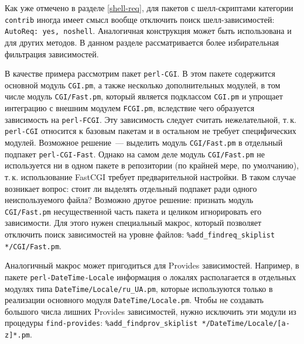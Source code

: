 \documentclass[russian,a4paper,12pt,titlepage]{article}
\begin{document}
Как уже отмечено в разделе \ref{shell-req}, для пакетов с шелл-скриптами категории \verb|contrib|
иногда имеет смысл вообще отключить поиск шелл-зависимостей: \texttt{AutoReq: yes, noshell}.  Аналогичная
конструкция может быть использована и для других методов.  В данном разделе рассматривается более избирательная
фильтрация зависимостей.

В качестве примера рассмотрим пакет \verb|perl-CGI|.  В этом пакете содержится основной модуль \verb|CGI.pm|,
а также несколько дополнительных модулей, в том числе модуль \verb|CGI/Fast.pm|, который является подклассом \verb|CGI.pm|
и упрощает интеграцию с внешним модулем \verb|FCGI.pm|, вследствие чего образуется зависимость на \verb|perl-FCGI|.
Эту зависимость следует считать нежелательной, т.\,к. \verb|perl-CGI| относится к базовым пакетам и в остальном не требует
специфических модулей.  Возможное решение~--- выделить модуль \verb|CGI/Fast.pm| в отдельный подпакет \verb|perl-CGI-Fast|.
Однако на самом деле модуль \verb|CGI/Fast.pm| не используется ни в одном пакете в репозитории (по крайней мере, по умолчанию),
т.\,к. использование FastCGI требует предварительной настройки.  В таком случае возникает вопрос: стоит ли выделять
отдельный подпакет ради одного неиспользуемого файла?  Возможно другое решение: признать модуль \verb|CGI/Fast.pm|
несущественной часть пакета и целиком игнорировать его зависимости.  Для этого нужен специальный макрос, который позволяет
отключить поиск зависимостей на уровне файлов: \verb|%add_findreq_skiplist */CGI/Fast.pm|.

Аналогичный макрос может пригодиться для Provides зависимостей.  Например, в пакете \verb|perl-DateTime-Locale|
информация о локалях располагается в отдельных модулях типа \verb|DateTime/Locale/ru_UA.pm|, которые используются
только в реализации основного модуля \verb|DateTime/Locale.pm|.  Чтобы не создавать большого числа лишних
Provides зависимостей, нужно исключить эти модули из процедуры \verb|find-provides|:
\verb|%add_findprov_skiplist */DateTime/Locale/[a-z]*.pm|.
\end{document}

